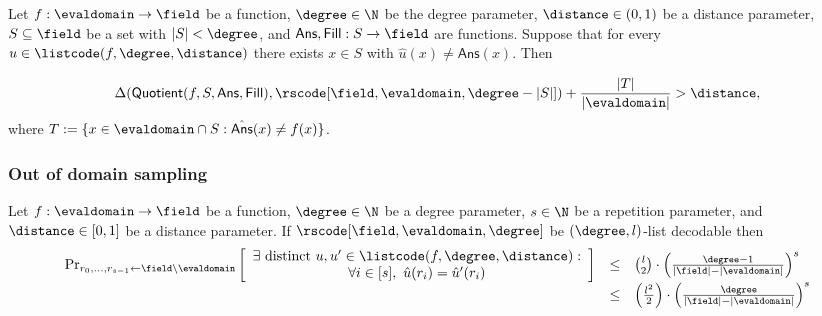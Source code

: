 \begin{lemma}\label{lemma:quotienting}
    Let $f:\evaldomain\rightarrow\field$ be a function, $\degree\in\N$ be the degree parameter, $\distance\in(0,1)$
    be a distance parameter, $S\subseteq\field$ be a set with $|S|<\degree$, and $\mathsf{Ans},\mathsf{Fill}:S\rightarrow\field$ are functions. Suppose that for every $u\in\listcode(f,\degree,\distance)$ there exists $x\in S$ with $\hat{u}(x)\neq\mathsf{Ans}(x)$. Then

    \[
            \Delta(\mathsf{Quotient}(f,S,\mathsf{Ans},\mathsf{Fill}),\rscode[\field,\evaldomain,\degree-|S|])+\frac{|T|}{|\evaldomain|}>\distance,
    \]
    where $T:=\{x\in\evaldomain\cap S: \hat{\mathsf{Ans}}(x)\neq f(x)\}$.
\end{lemma}

\subsubsection{Out of domain sampling}\label{sec:out_of_domain_smpl}
\begin{lemma}\label{lemma:out_of_domain_smpl}
    Let $f:\evaldomain\rightarrow\field$ be a function, $\degree\in\N$ be a degree parameter, $s\in\N$ be a repetition parameter, and $\distance\in[0,1]$ be a distance parameter. If $\rscode[\field,\evaldomain,\degree]$ be $(\degree,l)$-list decodable then
        \[
        \begin{array}{rcl}
        \Pr_{\substack{r_0, \ldots, r_{s-1} \gets \field \setminus \evaldomain}}
        \left[
        \begin{array}{c}
            \exists \text{ distinct } u, u' \in \listcode(f, \degree, \distance): \\
            \forall i \in [s],\ \hat{u}(r_i) = \hat{u}'(r_i)
        \end{array}
        \right]
        & \leq & \binom{l}{2} \cdot \left( \frac{\degree - 1}{|\field| - |\evaldomain|} \right)^s \\
        & \leq & \left( \frac{l^2}{2} \right) \cdot \left( \frac{\degree}{|\field| - |\evaldomain|} \right)^s
        \end{array}
        \]



\end{lemma}

